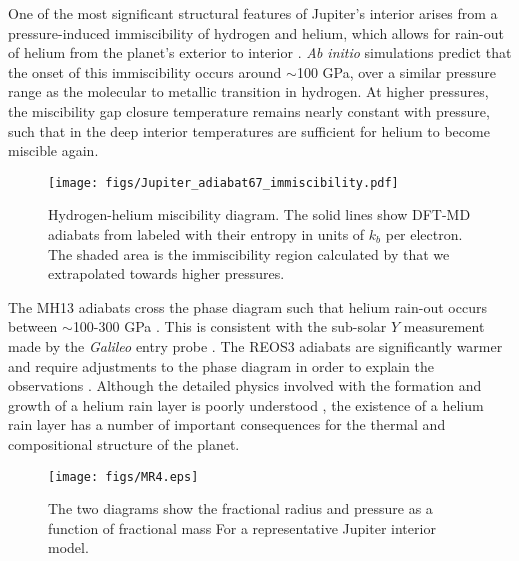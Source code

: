 One of the most significant structural features of Jupiter's interior
arises from a pressure-induced immiscibility of hydrogen and helium, which allows for
rain-out of helium from the planet's exterior to interior
\citep{stevenson1977a,stevenson1977b}. \textit{Ab initio} simulations
\citep{Morales2009,Lorenzen2009,Wilson2010,morales2013} predict that the onset of this
immiscibility occurs around $\sim$100 GPa, over a similar pressure range as the
molecular to metallic transition in hydrogen. At higher pressures, the miscibility
gap closure temperature remains nearly constant with pressure, such that in the deep
interior temperatures are sufficient for helium to become miscible again.


\begin{figure}[h]
  \begin{center}
    \noindent\texttt{[image: figs/Jupiter\_adiabat67\_immiscibility.pdf]}
  \end{center}
  \caption{Hydrogen-helium miscibility diagram. The solid lines show
    DFT-MD adiabats from \citet{militzer2013a} labeled with their entropy in
    units of $k_b$ per electron. The shaded area is the immiscibility
    region calculated by \citet{Morales2013} that we extrapolated
    towards higher pressures. }
  \label{fig:imm}
\end{figure}


The MH13 adiabats cross the \citet{morales2013} phase diagram such 
that helium rain-out occurs between $\sim$100-300 GPa \citep{militzer2016}.
This is consistent with the sub-solar $Y$ measurement made by the
\textit{Galileo} entry probe \citep{Zahn1998}. The REOS3 adiabats are
significantly warmer and require adjustments to the phase diagram in order to
explain the observations \citep{nettelmann2015}.  Although the detailed physics
involved with the formation and growth of a helium rain layer is poorly
understood \citep{Fortney2010}, the existence of a helium rain layer has a
number of important consequences for the thermal and compositional structure of
the planet.

\begin{figure}[h]
  \begin{center}
      \noindent\texttt{[image: figs/MR4.eps]}
  \end{center}
  \caption{The two diagrams show the
    fractional radius and pressure as a function of fractional mass
    For a representative Jupiter interior model.}
\label{fig:our_Jupiter_model}
\end{figure}



